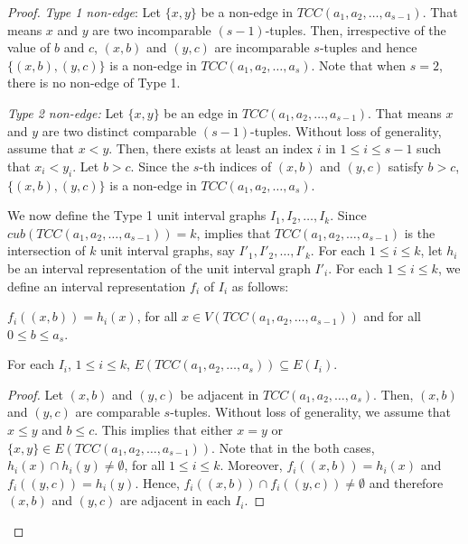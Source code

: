 \documentclass[10pt,a4paper]{amsart}
\newcommand{\TT}{TCC(a_1,a_2,\dots,a_s)}
\newcommand{\T}{TCC(a_1,a_2,\dots,a_{s-1})}
\begin{document}
\begin{proof}
    \textit{Type 1 non-edge}: Let $\{x,y\}$ be a non-edge in $\T$. That means $x$ and $y$ are two incomparable $(s-1)$-tuples. Then, irrespective of the value of $b$ and $c$, $(x,b)$ and $(y,c)$ are incomparable $s$-tuples and hence $\{(x,b),(y,c)\}$ is a non-edge in $\TT$. Note that when $s=2$, there is no non-edge of Type 1.

    \textit{Type 2 non-edge:} Let $\{x,y\}$ be an edge in $\T$. That means $x$ and $y$ are two distinct comparable $(s-1)$-tuples. Without loss of generality, assume that $x < y$. Then, there exists at least an index $i$ in $1 \leq i \leq s-1$ such that $x_i < y_i$. Let $b > c$. Since the $s$-th indices of $(x,b)$ and $(y,c)$ satisfy $b > c$, $\{(x,b),(y,c)\}$ is a non-edge in $\TT$.

    \vspace{0.2cm}

    We now define the Type 1 unit interval graphs \( I_1, I_2, \dots, I_k \). Since $cub(\T)=k$,  implies that $\T$ is the intersection of $k$ unit interval graphs, say $I'_1,I'_2,\dots, I'_k$. For each $1\leq i \leq k$, let $h_i$ be an interval representation of the unit interval graph $I'_i$. For each $1\leq i \leq k$, we define an interval representation $f_i$ of $I_i$ as follows: %

    
   \begin{center}
       $f_i((x,b)) = h_i(x)$, for all $x \in V(\T)$ and for all $0 \leq b \leq a_s$.
   \end{center} 

    \begin{claim}\label{type 1 interval graphs are supergraphs}
        For each $I_i$, $1 \leq i \leq k$, $E(\TT) \subseteq E(I_i)$.
    \end{claim}
    \begin{proof}
        
        Let $(x,b)$ and $(y,c)$ be adjacent in $\TT$. Then, $(x,b)$ and $(y,c)$ are comparable $s$-tuples. Without loss of generality, we assume that $x \leq y$ and $b \leq c$. This implies that either $x=y$ or $\{x,y\} \in E(\T)$. Note that in the both cases, $h_i(x) \cap h_i(y) \neq \emptyset$, for all $1 \leq i \leq k$. Moreover, $f_i((x,b))=h_i(x)$ and $f_i((y,c))=h_i(y)$. Hence, $f_i((x,b)) \cap f_i((y,c)) \neq \emptyset$ and therefore $(x,b)$ and $(y,c)$ are adjacent in each $I_i$.
    \end{proof}


\end{proof}
\end{document}
